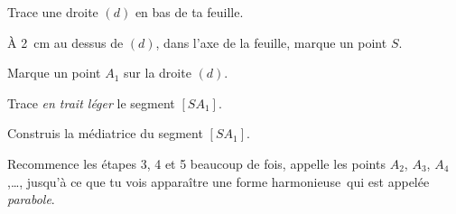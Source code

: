 \begin{myenumerate}
\item Trace une droite $(d)$ en bas de ta feuille.
\item \`A 2~cm au dessus de $(d)$, dans l'axe de la feuille, marque un
point $S$.
\item Marque un point $A_1$ sur la droite $(d)$.
\item Trace {\em en trait léger} le segment $[SA_1]$.
\item Construis la médiatrice du segment $[SA_1]$.
\item Recommence les étapes 3, 4 et 5 beaucoup de fois, appelle les
points $A_2$, $A_3$, $A_4$,\ldots, jusqu'à ce que tu vois apparaître
une forme \og harmonieuse\fg\ qui est appelée {\em parabole}.
\end{myenumerate}
